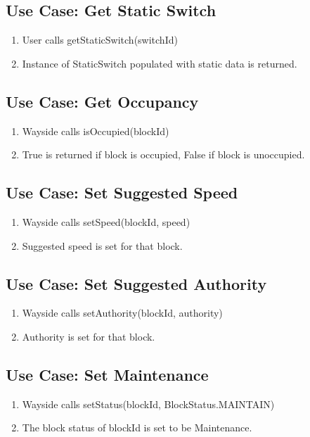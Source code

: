 \documentclass{scrreprt}
\begin{document}
\subsection{Use Case: Get Static Switch}
\begin{enumerate}
	\item User calls getStaticSwitch(switchId)
	\item Instance of StaticSwitch populated with static data is returned.
\end{enumerate}

\subsection{Use Case: Get Occupancy}
\begin{enumerate}
	\item Wayside calls isOccupied(blockId)
	\item True is returned if block is occupied, False if block is unoccupied.
\end{enumerate}

\subsection{Use Case: Set Suggested Speed}
\begin{enumerate}
	\item Wayside calls setSpeed(blockId, speed)
	\item Suggested speed is set for that block.
\end{enumerate}

\subsection{Use Case: Set Suggested Authority}
\begin{enumerate}
	\item Wayside calls setAuthority(blockId, authority)
	\item Authority is set for that block.
\end{enumerate}

\subsection{Use Case: Set Maintenance}
\begin{enumerate}
	\item Wayside calls setStatus(blockId, BlockStatus.MAINTAIN)
	\item The block status of blockId is set to be Maintenance.
\end{enumerate}
\end{document}

